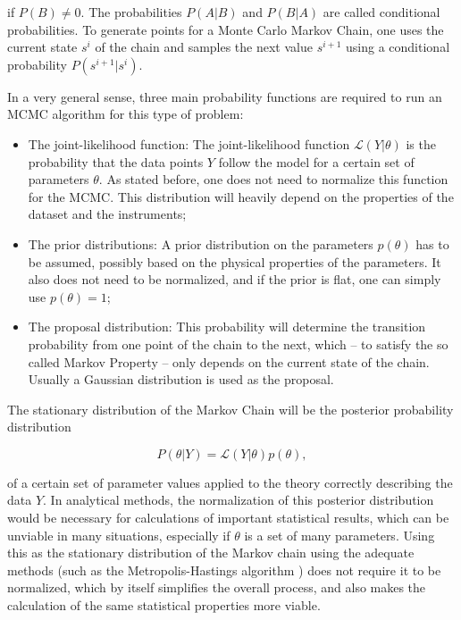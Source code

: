 \documentclass[openany,a4paper,12pt,oneside]{book}
\begin{document}
\begin{spacing}{1.5}
\noindent if $P(B)\neq 0$. The probabilities $P(A|B)$ and $P(B|A)$ are called conditional probabilities. To generate points for a Monte Carlo Markov Chain, one uses the current state $s^i$ of the chain and samples the next value $s^{i+1}$ using a conditional probability $P(s^{i+1}|s^i)$.

In a very general sense, three main probability functions are required to run an MCMC algorithm for this type of problem: 

\begin{itemize}
	\item The joint-likelihood function: The joint-likelihood function $\mathcal{L}(Y|\theta)$ is the probability that the data points $Y$ follow the model for a certain set of parameters $\theta$. As stated before, one does not need to normalize this function for the MCMC. This distribution will heavily depend on the properties of the dataset and the instruments;
	\item The prior distributions: A prior distribution on the parameters $p(\theta)$ has to be assumed, possibly based on the physical properties of the parameters. It also does not need to be normalized, and if the prior is flat, one can simply use $p(\theta)=1$;
	\item The proposal distribution: This probability will determine the transition probability from one point of the chain to the next, which -- to satisfy the so called Markov Property -- only depends on the current state of the chain. Usually a Gaussian distribution is used as the proposal.
\end{itemize}

The stationary distribution of the Markov Chain will be the posterior probability distribution

\begin{equation}\label{posterior_MCMC}
	P(\theta|Y)=\mathcal{L}(Y|\theta)p(\theta),
\end{equation}

\noindent of a certain set of parameter values applied to the theory correctly describing the data $Y$. In analytical methods, the normalization of this posterior distribution would be necessary for calculations of important statistical results, which can be unviable in many situations, especially if $\theta$ is a set of many parameters. Using this as the stationary distribution of the Markov chain using the adequate methods (such as the Metropolis-Hastings algorithm \cite{Metropolis_hastings}) does not require it to be normalized, which by itself simplifies the overall process, and also makes the calculation of the same statistical properties more viable.


\end{spacing}
\end{document}
